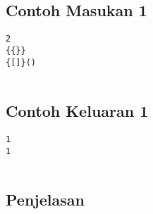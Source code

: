 \documentclass{article}
\begin{document}
\linebreak
\begin{multicols}{2}
\subsection*{Contoh Masukan 1}
\begin{lstlisting}
2
{{}}
{[]}()


\end{lstlisting}
\null
\columnbreak
\subsection*{Contoh Keluaran 1}
\begin{lstlisting}
1
1


\end{lstlisting}
\vfill
\null
\end{multicols}

\subsection*{Penjelasan}
\end{document}
